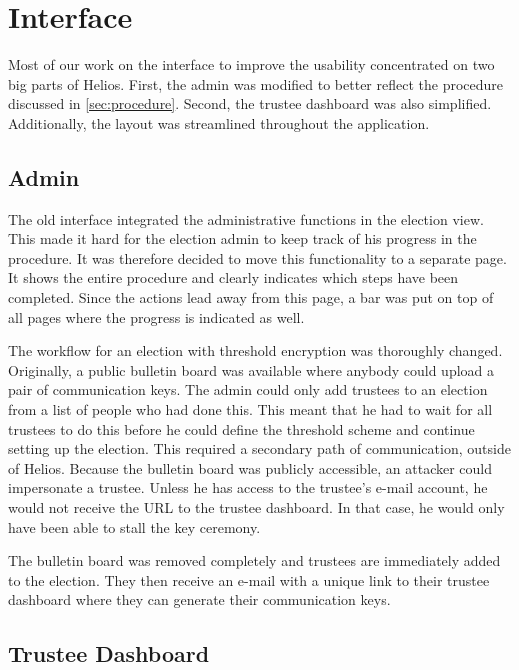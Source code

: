 % 
%

\section{Interface}

Most of our work on the interface to improve the usability concentrated on two big parts of Helios. First, the admin was modified to better reflect the procedure discussed in \ref{sec:procedure}. Second, the trustee dashboard was also simplified. Additionally, the layout was streamlined throughout the application.

\subsection{Admin}

The old interface integrated the administrative functions in the election view. This made it hard for the election admin to keep track of his progress in the procedure. It was therefore decided to move this functionality to a separate page. It shows the entire procedure and clearly indicates which steps have been completed. Since the actions lead away from this page, a bar was put on top of all pages where the progress is indicated as well.

\par The workflow for an election with threshold encryption was thoroughly changed. Originally, a public bulletin board was available where anybody could upload a pair of communication keys. The admin could only add trustees to an election from a list of people who had done this. This meant that he had to wait for all trustees to do this before he could define the threshold scheme and continue setting up the election. This required a secondary path of communication, outside of Helios. Because the bulletin board was publicly accessible, an attacker could impersonate a trustee. Unless he has access to the trustee's e-mail account, he would not receive the URL to the trustee dashboard. In that case, he would only have been able to stall the key ceremony.

\par The bulletin board was removed completely and trustees are immediately added to the election. They then receive an e-mail with a unique link to their trustee dashboard where they can generate their communication keys.

\subsection{Trustee Dashboard}

